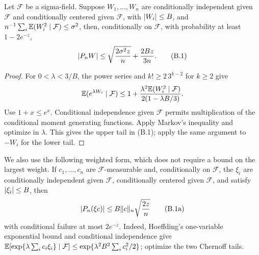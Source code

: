 \begin{lemma}
\label{lem:bernstein}
Let \(\mathcal F\) be a sigma-field.  Suppose \(W_1,\ldots,W_n\) are
conditionally independent given \(\mathcal F\) and conditionally centered
given \(\mathcal F\), with \(\lvert W_i\rvert\le B\), and
\(n^{-1}\sum_i\mathbb E(W_i^2\mid\mathcal F)\le\sigma^2\), then, conditionally on
\(\mathcal F\), with probability at least \(1-2e^{-z}\),
\[
 \lvert P_nW\rvert\le \sqrt{\frac{2\sigma^2z}{n}}+\frac{2Bz}{3n}.
 \tag{B.1}
\]
\end{lemma}
\begin{proof}
For \(0<\lambda<3/B\), the power series and
\(k!\ge2\,3^{k-2}\) for \(k\ge2\) give
\[
 \mathbb E(e^{\lambda W_i}\mid\mathcal F)
 \le1+\frac{\lambda^2\mathbb E(W_i^2\mid\mathcal F)}
 {2(1-\lambda B/3)}.
\]
Use \(1+x\le e^x\).  Conditional independence given \(\mathcal F\) permits
multiplication of the conditional moment generating functions.  Apply
Markov's inequality and optimize in \(\lambda\).  This gives the
upper tail in (B.1); apply the same argument to \(-W_i\) for the lower tail.
\end{proof}

We also use the following weighted form, which does not require a bound on
the largest weight.  If \(c_1,\ldots,c_n\) are \(\mathcal F\)-measurable and,
conditionally on \(\mathcal F\), the \(\xi_i\) are conditionally independent
given \(\mathcal F\), conditionally centered given \(\mathcal F\), and satisfy
\(\lvert \xi_i\rvert\le B\), then
\[
 \lvert P_n(\xi c)\rvert
 \le B\lVert c\rVert_n\sqrt{\frac{2z}{n}}
 \tag{B.1a}
\]
with conditional failure at most \(2e^{-z}\).  Indeed, Hoeffding's
one-variable exponential bound and conditional independence give
\(\mathbb E[\exp\{\lambda\sum_i c_i\xi_i\}\mid\mathcal F]
\le\exp\{\lambda^2B^2\sum_i c_i^2/2\}\); optimize the two Chernoff tails.

